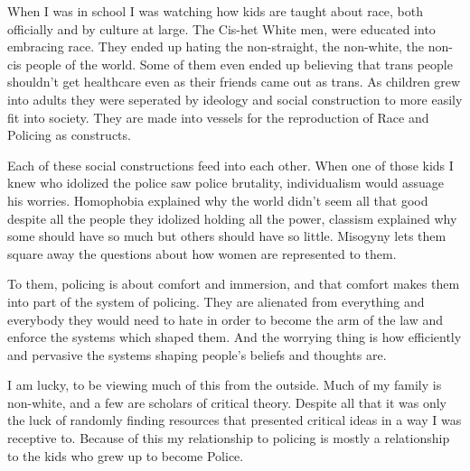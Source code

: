 \documentclass{report}
\begin{document}
When I was in school I was watching how kids are taught
about race, both officially and by culture at large. The
Cis-het White men, were educated into embracing race. They
ended up hating the non-straight, the non-white, the
non-cis people of the world. Some of them even ended up
believing that trans people shouldn't get healthcare even
as their friends came out as trans.
As children grew into adults they were seperated by ideology
and social construction to more easily fit into society.
They are made into vessels for the reproduction of Race
and Policing as constructs.

Each of these social constructions feed into each other.
When one of those kids I knew who idolized the police
saw police brutality, individualism would assuage his worries.
Homophobia explained why the world didn't seem all that good
despite all the people they idolized holding all the power,
classism explained why some should have so much but others
should have so little. Misogyny lets them square away the
questions about how women are represented to them. 

To them, policing is about comfort and immersion, and that 
comfort makes them into part of the system of policing. 
They are alienated from everything and everybody they 
would need to hate in order to become the arm of the law 
and enforce the systems which shaped them. And the worrying 
thing is how efficiently and pervasive the systems shaping 
people's beliefs and thoughts are.

I am lucky, to be viewing much of this from the outside.
Much of my family is non-white, and a few are scholars
of critical theory. Despite all that it was only the luck
of randomly finding resources that presented critical
ideas in a way I was receptive to. Because of this my 
relationship to policing is mostly a relationship to the kids 
who grew up to become Police.
\end{document}
